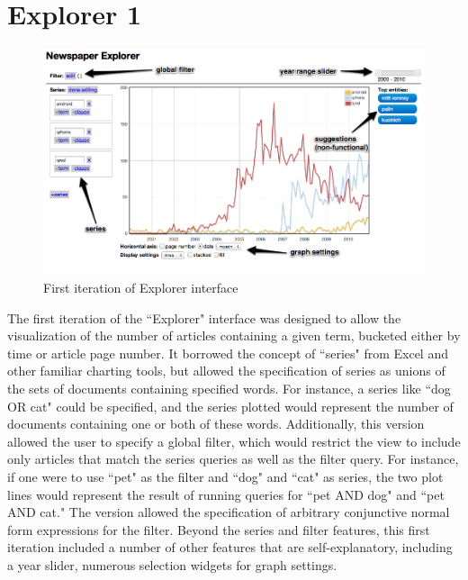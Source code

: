 \section{Explorer   1}


\begin{figure}[htb]
  \centerline{
    \includegraphics[scale=0.28]{figures/explorer-prototype.png}
  }
  \caption{First iteration of Explorer interface}
  \label{fig:explorer-prototype}
\end{figure}

The first iteration of the ``Explorer" interface was designed to allow the visualization of the number of articles containing a given term, bucketed either by time or article page number. It borrowed the concept of ``series" from Excel and other familiar charting tools, but allowed the specification of series as unions of the sets of documents containing specified words. For instance, a series like ``dog OR cat" could be specified, and the series plotted would represent the number of documents containing one or both of these words. Additionally, this version allowed the user to specify a global filter, which would restrict the view to include only articles that match the series queries as well as the filter query. For instance, if one were to use ``pet" as the filter and ``dog" and ``cat" as series, the two plot lines would represent the result of running queries for ``pet AND dog" and ``pet AND cat." The version allowed the specification of arbitrary conjunctive normal form expressions for the filter. Beyond the series and filter features, this first iteration included a number of other features that are self-explanatory, including a year slider, numerous selection widgets for graph settings. 
